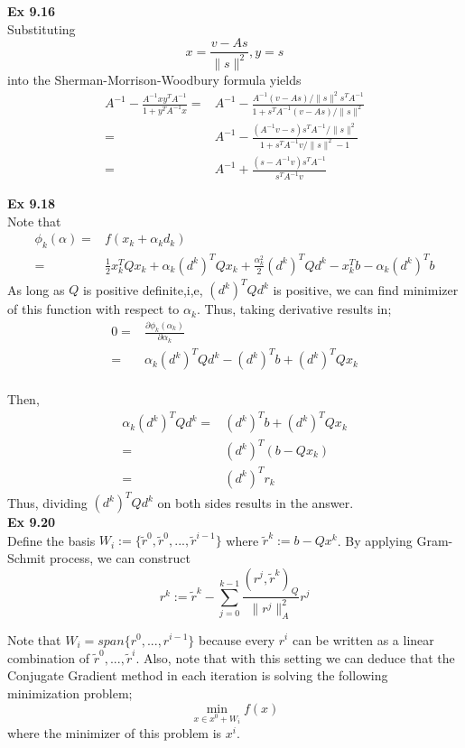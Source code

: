 \documentclass[letterpaper,12pt]{article}
\theoremstyle{definition}
\begin{document}
\textbf{Ex 9.16}\\

Substituting
\[x = \frac{v - As}{\|s\|^2}, y=s\]
into the Sherman-Morrison-Woodbury formula yields
\begin{align*}
  A^{-1} - \frac{A^{-1} x y^T A^{-1}}{1+ y^T A^{-1} x} =& A^{-1} - \frac{A^{-1} (v-As)/\|s\|^2 s^T A^{-1}}{1+s^T A^{-1} (v-As)/\|s\|^2} \\
  =& A^{-1} - \frac{(A^{-1} v -s) s^T A^{-1} /\|s\|^2 }{1+s^T A^{-1} v/\|s\|^2-1} \\
  =& A^{-1} + \frac{(s-A^{-1}v)s^T A^{-1}}{s^T A^{-1} v}
\end{align*}


\textbf{Ex 9.18}\\
Note that
\begin{align*}
   \phi_k(\alpha) =& f(x_k + \alpha_k d_k) \\
                  =& \frac{1}{2} x_k^{T} Q x_k + \alpha_k (d^{k})^T Q x_k + \frac{\alpha_k^2}{2} (d^{k})^T Q d^{k} - x_k^Tb - \alpha_k (d^k)^T b
\end{align*}
As long as $Q$ is positive definite,i,e, $(d^{k})^T Q d^{k}$ is positive, we can find minimizer of this function with respect to $\alpha_k$. Thus, taking derivative results in;
\begin{align*}
  0=& \frac{\partial \phi_k(\alpha_k)}{\partial \alpha_k}  \\
   =& \alpha_k (d^{k})^T Q d^k - (d^k)^T b + (d^k)^T Q x_k \\
\end{align*}

Then,
\begin{align*}
  \alpha_k (d^{k})^T Q d^k=& (d^k)^T b + (d^k)^T Q x_k \\
                          =& (d^k)^T(b-Q x_k) \\
                          =& (d^k)^T r_k
\end{align*}
Thus, dividing $(d^{k})^T Q d^k$ on both sides results in the answer.\\

\textbf{Ex 9.20}\\
Define the basis $W_i := \{\tilde{r}^{0}, \tilde{r}^{0}, ..., \tilde{r}^{i-1} \}$ where $\tilde{r}^{k} := b-Qx^{k}$. By applying Gram-Schmit process, we can construct
\[r^{k} := \tilde{r}^{k} - \sum_{j=0}^{k-1} \frac{(r^{j},\tilde{r}^{k})_Q}{ \| r^{j}\|_{A}^{2}} r^j  \]

Note that $W_i = span\{r^{0}, ..., r^{i-1}\}$ because every $r^i$ can be written as a linear combination of $\tilde{r}^{0}, ..., \tilde{r}^{i}$.
Also, note that with this setting we can deduce that the Conjugate Gradient method in each iteration is solving the following minimization problem;
\[ \min_{x \in x^{0} + W_i} f(x) \] where the minimizer of this problem is $x^i$. \\
\end{document}
